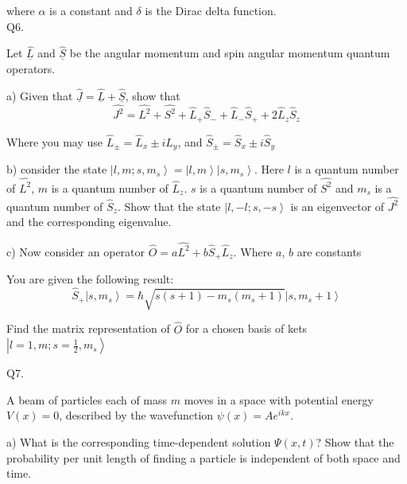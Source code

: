 \documentclass[a4paper,11pt]{article}
\begin{document}
\noindent where \( \alpha \) is a constant and \( \delta \) is the Dirac delta function.\\ 

\noindent Q6. 

\noindent Let \( \hat{\underline{L}} \) and \( \hat{\underline{S}} \) be the angular momentum and spin angular momentum quantum operators. 

\medskip

\noindent a) Given that \( \hat{\underline{J}} = \hat{\underline{L}} + \hat{\underline{S}} \), show that 
\[ \hat{J^{2}} =  \hat{L^{2}} + \hat{S^{2}} + \hat{L}_{+}\hat{S}_{-} +  \hat{L}_{-}\hat{S}_{+} + 2\hat{L}_{z}\hat{S}_{z} \]

\noindent Where you may use  \( \hat{L}_{\pm} = \hat{L}_{x} \pm i\hat{L}_{y} \), and \( \hat{S}_{\pm} = \hat{S}_{x} \pm i\hat{S}_{y} \)

\medskip

\noindent b) consider the state \( \left|l, m; s, m_{s} \right> = \left|l, m \right>\left|s, m_{s} \right> \). Here \( l \) is a quantum number of \( \hat{L^{2}} \), \( m \) is a quantum number of \( \hat{L}_{z} \). \( s \) is a quantum number of \( \hat{S^{2}} \) and \( m_{s} \) is a quantum number of \( \hat{S}_{z} \). Show that the state \( \left|l, -l; s, -s \right> \) is an eigenvector of \( \hat{J^{2}} \) and the corresponding eigenvalue. 

\medskip

\noindent c) Now consider an operator \( \hat{O} = a\hat{L^{2}} + b\hat{S}_{+}\hat{L}_{z} \). Where \( a \), \( b \) are constants

\noindent You are given the following result:
\[ \hat{S}_{+} \left|s, m_{s} \right> = \hbar \sqrt{s(s+1) - m_{s}(m_{s}+1)} \left|s, m_{s}+1 \right> \]

\smallskip

\noindent Find the matrix representation of \( \hat{O} \) for a chosen basis of kets \( \left|l=1, m; s=\frac{1}{2}, m_{s} \right> \)

\bigskip

\noindent Q7.

\noindent A beam of particles each of mass \( m \) moves in a space with potential energy \( V(x) = 0 \), described by the wavefunction \( \psi(x) = Ae^{ikx} \).

\medskip

\noindent a) What is the corresponding time-dependent solution \( \Psi(x,t) \)? Show that the probability per unit length of finding a particle is independent of both space and time.
\end{document}
